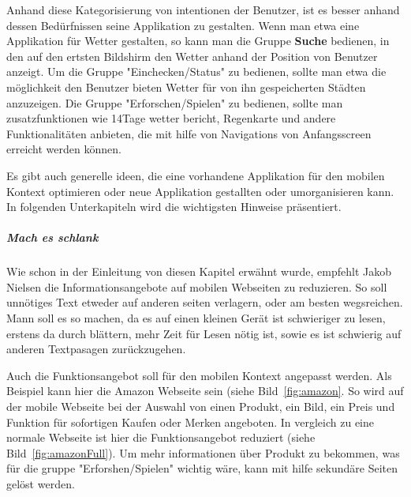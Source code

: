 Anhand diese Kategorisierung von intentionen der Benutzer, ist es besser anhand dessen Bedürfnissen seine Applikation zu gestalten. Wenn man etwa eine Applikation für Wetter gestalten, so kann man die Gruppe \textbf{Suche} bedienen, in den auf den ertsten Bildshirm den Wetter anhand der Position von Benutzer anzeigt. Um die Gruppe "Einchecken/Status" zu bedienen, sollte man etwa die möglichkeit den Benutzer bieten Wetter für von ihn gespeicherten Städten anzuzeigen. Die Gruppe "Erforschen/Spielen" zu bedienen, sollte man zusatzfunktionen wie 14Tage wetter bericht, Regenkarte und andere Funktionalitäten anbieten, die mit hilfe von Navigations von Anfangsscreen erreicht werden können.

Es gibt auch generelle ideen, die eine vorhandene Applikation für den mobilen Kontext optimieren oder neue Applikation gestallten oder umorganisieren kann. In folgenden Unterkapiteln wird die wichtigsten Hinweise präsentiert. 

\subparagraph{Mach es schlank} 
\label{subp:entferne_das_fett}

Wie schon in der Einleitung von diesen Kapitel erwähnt wurde, empfehlt Jakob Nielsen die Informationsangebote auf mobilen Webseiten zu reduzieren. So soll unnötiges Text etweder auf anderen seiten verlagern, oder am besten wegsreichen. Mann soll es so machen, da es auf einen kleinen Gerät ist schwieriger zu lesen\cite[Seite 102]{Nielsen:2012wj}, erstens da durch blättern, mehr Zeit für Lesen nötig ist, sowie es ist schwierig auf anderen Textpasagen zurückzugehen.

 Auch die Funktionsangebot soll für den mobilen Kontext angepasst werden. Als Beispiel kann hier die Amazon Webseite sein (siehe Bild~\ref{fig:amazon}. So wird auf der mobile Webseite bei der Auswahl von einen Produkt, ein Bild, ein Preis und Funktion für sofortigen Kaufen oder Merken angeboten. In vergleich zu eine normale Webseite ist hier die Funktionsangebot reduziert (siehe Bild~\ref{fig:amazonFull}). Um mehr informationen über Produkt zu bekommen, was für die gruppe "Erforshen/Spielen" wichtig wäre, kann mit hilfe sekundäre Seiten gelöst werden.

